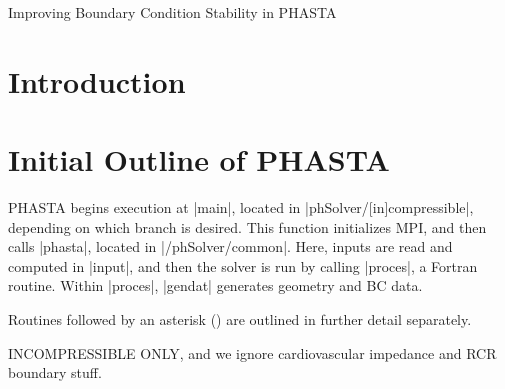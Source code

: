 \documentclass[11pt]{article}
\begin{document}
{
	\fancyhf[LH]{\rightmark}
	\fancyhf[CH]{}
	\fancyhf[RH]{\thepage\hspace*{1ex}/\hspace*{1ex}\pageref{lastpage}}
	\fancyhf[LF]{}
	\fancyhf[CF]{}
	\fancyhf[RF]{}
}

{
	\fancyhf[CH]{}
	\fancyhf[LF]{}
	\fancyhf[CF]{}
	\fancyhf[RF]{}
}

\pagestyle{allpages}
\thispagestyle{firstpage}
\renewcommand{\sectionmark}[1]{ \markright{#1}{} }

\vspace*{0in}
\begin{center}
\LARGE Improving Boundary Condition Stability in PHASTA
\end{center}
\vspace*{0.3in}

\section{Introduction}

\section{Initial Outline of PHASTA}

PHASTA begins execution at |main|, located in |phSolver/[in]compressible|, depending on which branch is desired. This function initializes MPI, and then calls |phasta|, located in |/phSolver/common|. Here, inputs are read and computed in |input|, and then the solver is run by calling |proces|, a Fortran routine. Within |proces|, |gendat| generates geometry and BC data.

Routines followed by an asterisk (\ra) are outlined in further detail separately.

{\huge \color{red!75!black} INCOMPRESSIBLE ONLY}, and we ignore cardiovascular impedance and RCR boundary stuff.
\end{document}
